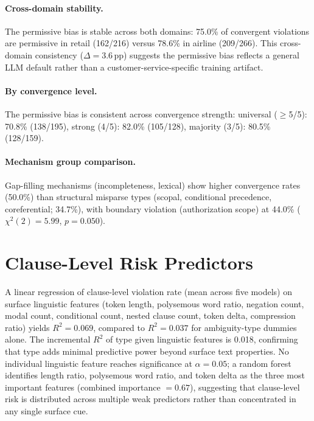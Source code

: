 \paragraph{Cross-domain stability.} The permissive bias is stable across both domains: 75.0\% of convergent violations are permissive in retail (162/216) versus 78.6\% in airline (209/266). This cross-domain consistency ($\Delta = 3.6$\,pp) suggests the permissive bias reflects a general LLM default rather than a customer-service-specific training artifact.

\paragraph{By convergence level.} The permissive bias is consistent across convergence strength: universal ($\geq$5/5): 70.8\% (138/195), strong (4/5): 82.0\% (105/128), majority (3/5): 80.5\% (128/159).

\paragraph{Mechanism group comparison.} Gap-filling mechanisms (incompleteness, lexical) show higher convergence rates (50.0\%) than structural misparse types (scopal, conditional precedence, coreferential; 34.7\%), with boundary violation (authorization scope) at 44.0\% ($\chi^2(2) = 5.99$, $p = 0.050$).

\section{Clause-Level Risk Predictors}
\label{app:clause_predictors}

A linear regression of clause-level violation rate (mean across five models) on surface linguistic features (token length, polysemous word ratio, negation count, modal count, conditional count, nested clause count, token delta, compression ratio) yields $R^2 = 0.069$, compared to $R^2 = 0.037$ for ambiguity-type dummies alone. The incremental $R^2$ of type given linguistic features is 0.018, confirming that type adds minimal predictive power beyond surface text properties. No individual linguistic feature reaches significance at $\alpha = 0.05$; a random forest identifies length ratio, polysemous word ratio, and token delta as the three most important features (combined importance $= 0.67$), suggesting that clause-level risk is distributed across multiple weak predictors rather than concentrated in any single surface cue.

